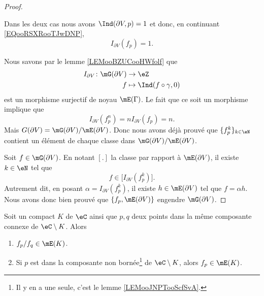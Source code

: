 \begin{proof}
\begin{subproof}
    \end{subproof}
    Dans les deux cas nous avons \( \Ind(\partial V, p)=1\) et donc, en continuant \eqref{EQooRSXRooTJwDNP},
    \begin{equation}
        I_{\partial V}(f_p)=1.
    \end{equation}

    Nous savons par le lemme \ref{LEMooBZUCooHWfolf} que
    \begin{equation}
        \begin{aligned}
            I_{\partial V}\colon \mG(\partial V)&\to \eZ \\
            f&\mapsto \Ind(f\circ \gamma,0) 
        \end{aligned}
    \end{equation}
    est un morphisme surjectif de noyau \( \mE(\Gamma)\). Le fait que ce soit un morphisme implique que
    \begin{equation}
        I_{\partial V}(f_p^n)=nI_{\partial V}(f_p)=n.
    \end{equation}
    Mais \( G(\partial V)=\mG(\partial V)/\mE(\partial V)\). Donc nous avons déjà prouvé que \( \{ f_p^k \}_{k\in \eN}\) contient un élément de chaque classe dans \( \mG(\partial V)/\mE(\partial V)\).

    Soit \( f\in \mG(\partial V)\). En notant \( [.]\) la classe par rapport à \( \mE(\partial V)\), il existe \( k\in \eN\) tel que
    \begin{equation}
        f\in\big[ I_{\partial V}(f_p^k) \big].
    \end{equation}
    Autrement dit, en posant \( \alpha=I_{\partial V}(f_p^k)\), il existe \( h\in \mE(\partial V)\) tel que \( f=\alpha h\). Nous avons donc bien prouvé que \( \{ f_p,\mE(\partial V) \}\) engendre \( \mG(\partial V)\).
\end{proof}

\begin{proposition}       \label{PROPooJNZQooLWDKww}
    Soit un compact \( K\) de \( \eC\) ainsi que \( p,q\) deux points dans la même composante connexe de \( \eC\setminus K\). Alors
    \begin{enumerate}
        \item       \label{ITEMooQMKOooQHhUGn}
            \( f_p/f_q\in\mE(K)\).
        \item       \label{ITEMooUJLPooApgXIF}
            Si \( p\) est dans la composante non bornée\footnote{Il y en a une seule, c'est le lemme \ref{LEMooJNPTooScfSvA}.} de \( \eC\setminus K\), alors \( f_p\in\mE(K)\).
    \end{enumerate}
\end{proposition}

